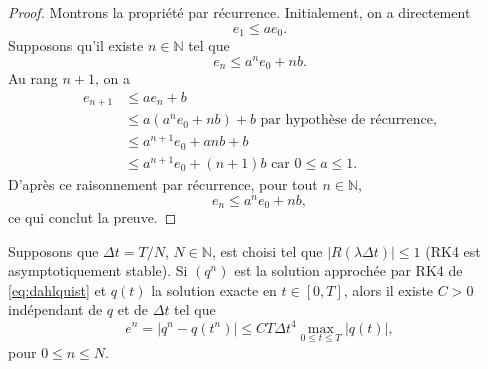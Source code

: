 \begin{proof}
Montrons la propriété par récurrence. Initialement, on a directement
\begin{equation}
e_1 \leq a e_0.
\end{equation}
Supposons qu'il existe $n \in \mathbb{N}$ tel que
\begin{equation}
e_n \leq a^n e_0 + nb.
\end{equation}
Au rang $n+1$, on a
\begin{align*}
e_{n+1} & \leq a e_n + b \\
	& \leq a \left( a^n e_0 + nb \right) + b \text{ par hypothèse de récurrence,}  \\
	& \leq a^{n+1} e_0 + anb + b\\
	& \leq a^{n+1} e_0 + (n+1)b \text{ car } 0 \leq a \leq 1.
\end{align*}
D'après ce raisonnement par récurrence, pour tout $n \in \mathbb{N}$,
\begin{equation}
e_n \leq a^n e_0 + nb,
\end{equation}
ce qui conclut la preuve.
\end{proof}

\begin{proposition}
Supposons que $\Delta t = T/N$, $N \in \mathbb{N}$, est choisi tel que $|R(\lambda \Delta t ) | \leq 1$ (RK4 est asymptotiquement stable). Si $(q^{n})$ est la solution approchée par RK4 de \eqref{eq:dahlquist} et $q(t)$ la solution exacte en $t \in [0,T]$, alors il existe $C>0$ indépendant de $q$ et de $\Delta t$ tel que
\begin{equation}
e^{n} = | q^{n} - q(t^{n}) | \leq C T \Delta t^4 \max_{0 \leq t \leq T} | q(t) |,
\end{equation}
pour $0 \leq n \leq N$.
\label{prop:consistance_rk4}
\end{proposition}

